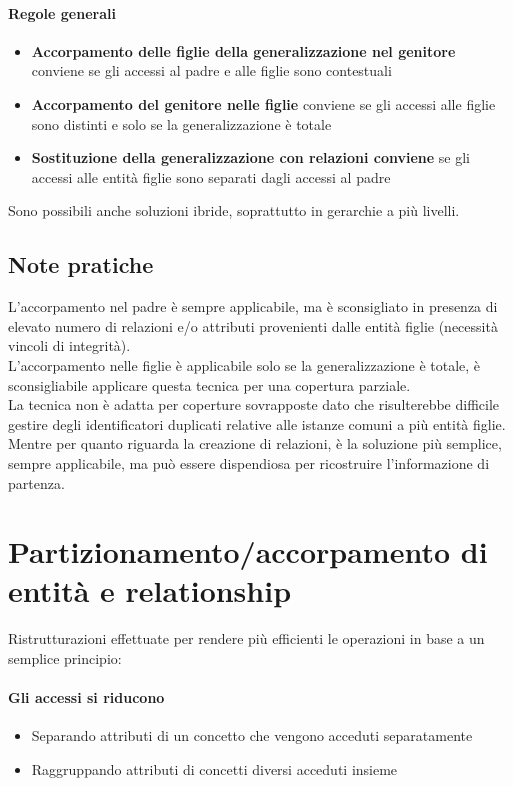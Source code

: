 \paragraph*{Regole generali}
\begin{itemize}
    \item \textbf{Accorpamento delle figlie della generalizzazione nel genitore} conviene se gli accessi
    al padre e alle figlie sono contestuali
    \item \textbf{Accorpamento del genitore nelle figlie} conviene se gli accessi alle figlie sono distinti e
    solo se la generalizzazione è totale
    \item \textbf{Sostituzione della generalizzazione con relazioni conviene} se gli accessi alle entità figlie
    sono separati dagli accessi al padre
\end{itemize}
Sono possibili anche soluzioni ibride, soprattutto in gerarchie a più livelli.
\subsection{Note pratiche}
L'accorpamento nel padre è sempre applicabile, ma è sconsigliato in presenza di
elevato numero di relazioni e/o attributi provenienti dalle entità figlie (necessità
vincoli di integrità).\\
L'accorpamento nelle figlie è applicabile solo se la generalizzazione è totale, è
sconsigliabile applicare questa tecnica per una copertura parziale.\\
La tecnica non è adatta per coperture sovrapposte dato che risulterebbe difficile
gestire degli identificatori duplicati relative alle istanze comuni a più entità figlie.\\
Mentre per quanto riguarda la creazione di relazioni, è la soluzione più semplice, sempre applicabile, 
ma può essere dispendiosa per ricostruire l'informazione di partenza.
\section{Partizionamento/accorpamento di entità e relationship}
Ristrutturazioni effettuate per rendere più efficienti le operazioni in base a un
semplice principio:
\paragraph*{Gli accessi si riducono}
\begin{itemize}
    \item Separando attributi di un concetto che vengono acceduti separatamente
    \item Raggruppando attributi di concetti diversi acceduti insieme
\end{itemize}
